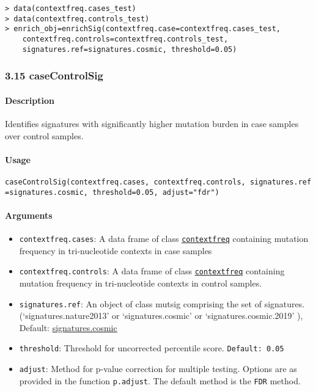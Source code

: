 \documentclass[]{article}
\providecommand{\tightlist}{%
  \setlength{\itemsep}{0pt}\setlength{\parskip}{0pt}}
\let\oldparagraph\paragraph
\renewcommand{\paragraph}[1]{\oldparagraph{#1}\mbox{}}
\begin{document}
\begin{verbatim}
> data(contextfreq.cases_test)
> data(contextfreq.controls_test)
> enrich_obj=enrichSig(contextfreq.case=contextfreq.cases_test,
	contextfreq.controls=contextfreq.controls_test, 
	signatures.ref=signatures.cosmic, threshold=0.05)
\end{verbatim}

\subsubsection{3.15 caseControlSig}\label{casecontrolsig}

\paragraph{\texorpdfstring{\textbf{Description}}{Description}}\label{description-11}

Identifies signatures with significantly higher mutation burden in case
samples over control samples.

\paragraph{\texorpdfstring{\textbf{Usage}}{Usage}}\label{usage-13}

\texttt{caseControlSig(contextfreq.cases,\ contextfreq.controls,\ signatures.ref=signatures.cosmic,\ threshold=0.05,\ adjust="fdr")}

\paragraph{\texorpdfstring{\textbf{Arguments
}}{Arguments }}\label{arguments-12}

\begin{itemize}
\tightlist
\item
  \texttt{contextfreq.cases}: A data frame of class
  \protect\hyperlink{contextfreq}{\texttt{contextfreq}} containing
  mutation frequency in tri-nucleotide contexts in case samples
\item
  \texttt{contextfreq.controls}: A data frame of class
  \protect\hyperlink{contextfreq}{\texttt{contextfreq}} containing
  mutation frequency in tri-nucleotide contexts in control samples.
\item
  \texttt{signatures.ref}: An object of class mutsig comprising the set of signatures. (`signatures.nature2013' or `signatures.cosmic' or `signatures.cosmic.2019' ), Default: \href{https://cran.r-project.org/web/packages/deconstructSigs/deconstructSigs.pdf}{signatures.cosmic} 
\item
  \texttt{threshold}: Threshold for uncorrected percentile score.
  \texttt{Default:\ 0.05}
\item
  \texttt{adjust}: Method for p-value correction for multiple testing.
  Options are as provided in the function \texttt{p.adjust}. The default
  method is the \texttt{FDR} method.
\end{itemize}
\end{document}
